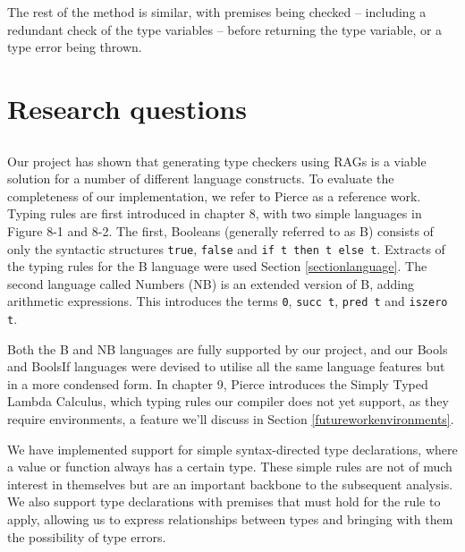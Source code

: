 \documentclass[nofilelist]{cslthse-msc}
\newcommand{\CR}[1]{\textcolor{green!60!black}{[\textbf{CR}:#1]}}
\begin{document}
The rest of the method is similar, with premises being checked -- including a redundant check of the type variables -- before returning the type variable, or a type error being thrown.

\section{Research questions}\label{sectionresearchquestions}

\subsection{\rqone}
Our project has shown that generating type checkers using RAGs is a viable solution for a number of different language constructs.
To evaluate the completeness of our implementation, we refer to Pierce\cite{Pierce} as a reference work.
Typing rules are first introduced in chapter 8, with two simple languages in Figure 8-1 and 8-2.
The first, Booleans (generally referred to as B) consists of only the syntactic structures \lstinline{true}, \lstinline{false} and \lstinline{if t then t else t}.
Extracts of the typing rules for the B language were used Section \ref{sectionlanguage}.
The second language called Numbers (NB) is an extended version of B, adding arithmetic expressions.
This introduces the terms \lstinline{0}, \lstinline{succ t}, \lstinline{pred t} and \lstinline{iszero t}.

Both the B and NB languages are fully supported by our project, and our Bools and BoolsIf languages were devised to utilise all the same language features but in a more condensed form.
In chapter 9, Pierce introduces the Simply Typed Lambda Calculus, which typing rules our compiler does not yet support, as they require environments, a feature we'll discuss in Section \ref{futureworkenvironments}.

We have implemented support for simple syntax-directed type declarations, where a value or function always has a certain type.
These simple rules are not of much interest in themselves but are an important backbone to the subsequent analysis.
We also support type declarations with premises that must hold for the rule to apply, allowing us to express relationships between types and bringing with them the possibility of type errors.
\end{document}
